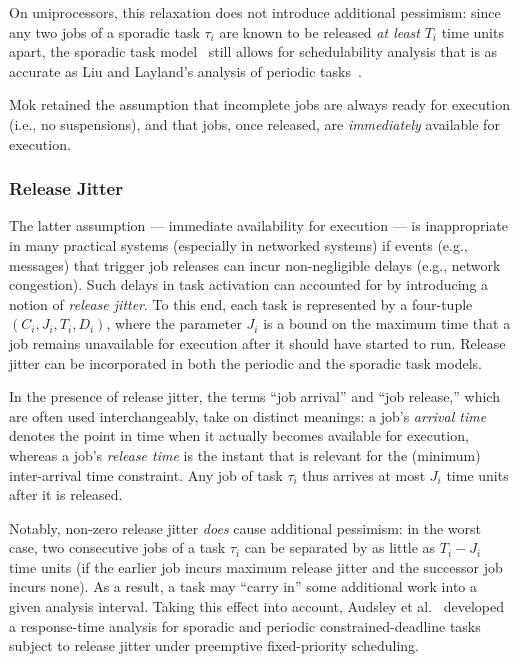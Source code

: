 On uniprocessors, this relaxation does not introduce additional pessimism: since any two jobs of a sporadic task $\tau_i$ are  known to be released \emph{at least} $T_i$ time units apart, the sporadic task model~\cite{Mo:83} still allows for schedulability analysis that is as accurate as Liu and Layland's analysis of periodic tasks~\cite{LL:73}. 

Mok retained the assumption that incomplete jobs are always ready for execution (i.e., no suspensions), and that jobs, once released, are \emph{immediately} available for execution. 


\subsubsection{Release Jitter}
\label{sec:jitter}

The latter assumption --- immediate availability for execution --- is inappropriate in many practical systems (especially in networked systems) if events (e.g., messages) that trigger job releases can incur non-negligible delays (e.g., network congestion). Such delays in task activation can accounted for by introducing a notion of \emph{release jitter}. To this end, each task is represented by a four-tuple $(C_i, J_i, T_i, D_i)$, where the parameter $J_i$ is a bound on the maximum time that a job remains unavailable for execution after it should have started to run. Release jitter can be incorporated in both the periodic and the sporadic task models.

In the presence of release jitter, the terms ``job arrival'' and ``job release,'' which are often used interchangeably, take on distinct meanings: a job's \emph{arrival time} denotes the point in time when it actually becomes available for execution, whereas a job's \emph{release time} is the instant that is relevant for the (minimum) inter-arrival time constraint. Any job of task $\tau_i$ thus arrives at most $J_i$ time units after it is released.

Notably, non-zero release jitter \emph{does} cause additional pessimism: in the worst case, two consecutive jobs of a task $\tau_i$ can be separated by as little as $T_i - J_i$ time units (if the earlier job incurs maximum release jitter and the successor job incurs none). As a result, a task may ``carry in'' some additional work into a given analysis interval. Taking this effect into account, Audsley et al.~\cite{ABRTW:93} developed a response-time analysis for sporadic and periodic constrained-deadline tasks subject to release jitter under preemptive fixed-priority scheduling.


